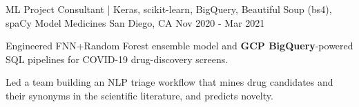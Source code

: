 \documentclass[11pt, a4paper]{awesome-cv}
\begin{document}
\begin{cventries}
  \cventry
    {ML Project Consultant | Keras, scikit-learn, BigQuery, Beautiful Soup (bs4), spaCy}
    {Model Medicines}
    {San Diego, CA}
    {Nov 2020 - Mar 2021}
    {
      \begin{cvitems}
        \item {Engineered FNN+Random Forest ensemble model and \textbf{GCP BigQuery}-powered SQL pipelines for COVID-19 drug-discovery screens.}
        \item {Led a team building an NLP triage workflow that mines drug candidates and their synonyms in the scientific literature, and predicts novelty.}
      \end{cvitems}
    }

\end{cventries}

\end{document}
